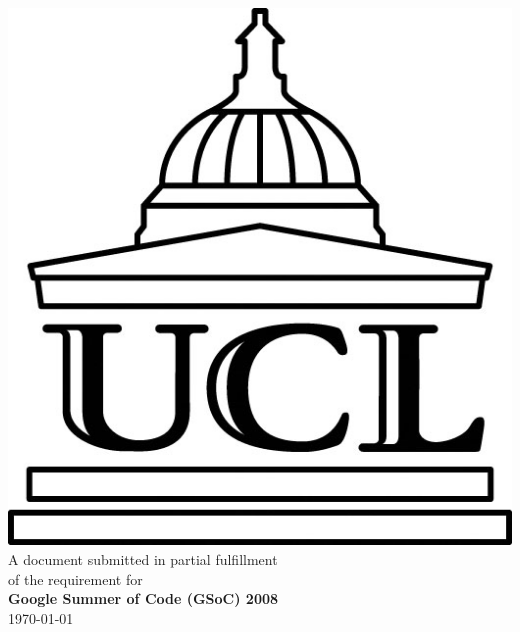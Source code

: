 \documentclass[a4paper,10pt]{article}
\begin{document}
\begin{titlepage}
\vspace{2cm}
\begin{small}
\begin{center}
\includegraphics[scale=.15]{./img/ucl_logo} \\
\vspace{1cm}
A document submitted in partial fulfillment \\
of the requirement for \\
\textsf{\textbf{Google Summer of Code (GSoC) 2008}} \\
\vspace{1cm}
\textsf{\today}
\end{center}
\end{small}

\end{titlepage}

\thispagestyle{empty}
\begin{center}
    \begin{abstract}
    
    \end{abstract}
\end{center}
\clearpage
\newpage
\end{document}
